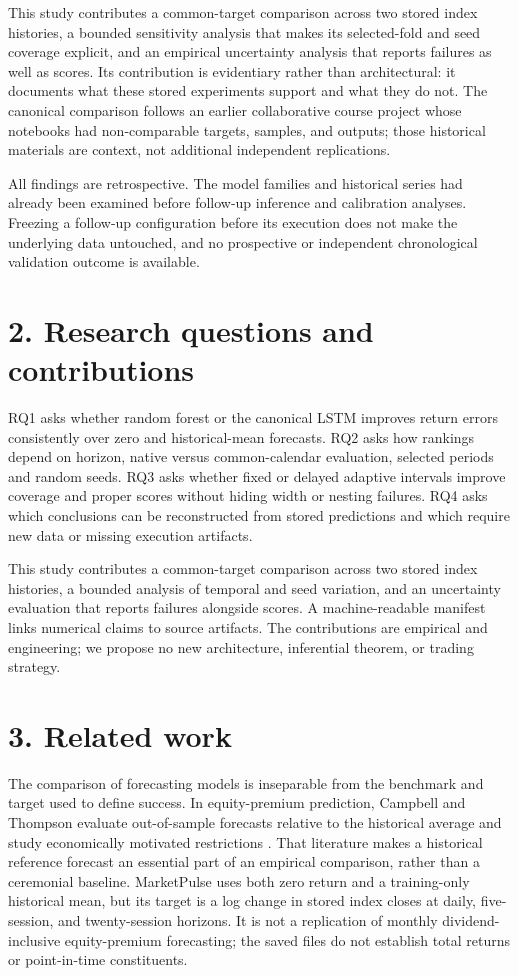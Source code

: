 \documentclass[11pt]{article}
\begin{document}
This study contributes a common-target comparison across two stored index histories, a bounded sensitivity analysis that makes its selected-fold and seed coverage explicit, and an empirical uncertainty analysis that reports failures as well as scores. Its contribution is evidentiary rather than architectural: it documents what these stored experiments support and what they do not. The canonical comparison follows an earlier collaborative course project whose notebooks had non-comparable targets, samples, and outputs; those historical materials are context, not additional independent replications.

All findings are retrospective. The model families and historical series had already been examined before follow-up inference and calibration analyses. Freezing a follow-up configuration before its execution does not make the underlying data untouched, and no prospective or independent chronological validation outcome is available.

\section*{2. Research questions and contributions}

RQ1 asks whether random forest or the canonical LSTM improves return errors consistently over zero and historical-mean forecasts. RQ2 asks how rankings depend on horizon, native versus common-calendar evaluation, selected periods and random seeds. RQ3 asks whether fixed or delayed adaptive intervals improve coverage and proper scores without hiding width or nesting failures. RQ4 asks which conclusions can be reconstructed from stored predictions and which require new data or missing execution artifacts.

This study contributes a common-target comparison across two stored index histories, a bounded analysis of temporal and seed variation, and an uncertainty evaluation that reports failures alongside scores. A machine-readable manifest links numerical claims to source artifacts. The contributions are empirical and engineering; we propose no new architecture, inferential theorem, or trading strategy.

\section*{3. Related work}

The comparison of forecasting models is inseparable from the benchmark and target used to define success. In equity-premium prediction, Campbell and Thompson evaluate out-of-sample forecasts relative to the historical average and study economically motivated restrictions \citep{campbell2005}. That literature makes a historical reference forecast an essential part of an empirical comparison, rather than a ceremonial baseline. MarketPulse uses both zero return and a training-only historical mean, but its target is a log change in stored index closes at daily, five-session, and twenty-session horizons. It is not a replication of monthly dividend-inclusive equity-premium forecasting; the saved files do not establish total returns or point-in-time constituents.
\end{document}
